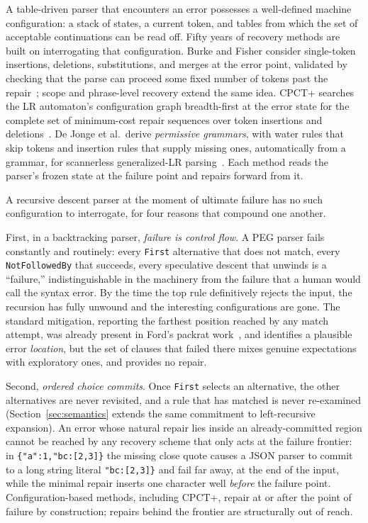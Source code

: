 \documentclass[manuscript]{acmart}
\newcommand{\cd}[1]{\texttt{#1}}
\begin{document}
A table-driven parser that encounters an error possesses a well-defined machine configuration: a stack of states, a current token, and tables from which the set of acceptable continuations can be read off. Fifty years of recovery methods are built on interrogating that configuration. Burke and Fisher consider single-token insertions, deletions, substitutions, and merges at the error point, validated by checking that the parse can proceed some fixed number of tokens past the repair~\cite{burke1987}; scope and phrase-level recovery extend the same idea. CPCT+ searches the LR automaton's configuration graph breadth-first at the error state for the complete set of minimum-cost repair sequences over token insertions and deletions~\cite{diekmann2020}. De Jonge et al.\ derive \emph{permissive grammars}, with water rules that skip tokens and insertion rules that supply missing ones, automatically from a grammar, for scannerless generalized-LR parsing~\cite{dejonge2012}. Each method reads the parser's frozen state at the failure point and repairs forward from it.

A recursive descent parser at the moment of ultimate failure has no such configuration to interrogate, for four reasons that compound one another.

First, in a backtracking parser, \emph{failure is control flow}. A PEG parser fails constantly and routinely: every \cd{First} alternative that does not match, every \cd{NotFollowedBy} that succeeds, every speculative descent that unwinds is a ``failure,'' indistinguishable in the machinery from the failure that a human would call the syntax error. By the time the top rule definitively rejects the input, the recursion has fully unwound and the interesting configurations are gone. The standard mitigation, reporting the farthest position reached by any match attempt, was already present in Ford's packrat work~\cite{ford2002b}, and identifies a plausible error \emph{location}, but the set of clauses that failed there mixes genuine expectations with exploratory ones, and provides no repair.

Second, \emph{ordered choice commits}. Once \cd{First} selects an alternative, the other alternatives are never revisited, and a rule that has matched is never re-examined (Section~\ref{sec:semantics} extends the same commitment to left-recursive expansion). An error whose natural repair lies inside an already-committed region cannot be reached by any recovery scheme that only acts at the failure frontier: in \cd{\{"a":1,"bc:[2,3]\}} the missing close quote causes a JSON parser to commit to a long string literal \cd{"bc:[2,3]\}} and fail far away, at the end of the input, while the minimal repair inserts one character well \emph{before} the failure point. Configuration-based methods, including CPCT+, repair at or after the point of failure by construction; repairs behind the frontier are structurally out of reach.
\end{document}
